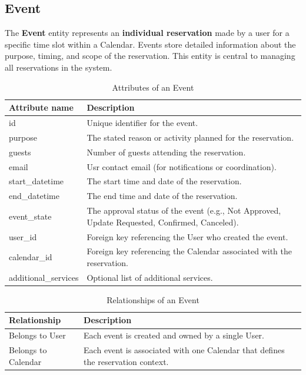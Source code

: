 \subsection{Event}

The \textbf{Event} entity represents an \textbf{individual reservation} made by a user for a specific time slot within a Calendar. Events store detailed information about the purpose, timing, and scope of the reservation. This entity is central to managing all reservations in the system. 

\begin{table}[H]
  \centering
  \begin{tabularx}{\textwidth}{|l|X|}
  \hline
  \textbf{Attribute name} & \textbf{Description} \\
  \hline
  id & Unique identifier for the event. \\
  \hline
  purpose & The stated reason or activity planned for the reservation. \\
  \hline
  guests & Number of guests attending the reservation. \\
  \hline
  email & Usr contact email (for notifications or coordination). \\
  \hline
  start\_datetime & The start time and date of the reservation. \\
  \hline
  end\_datetime & The end time and date of the reservation. \\
  \hline
  event\_state & The approval status of the event (e.g., Not Approved, Update Requested, Confirmed, Canceled). \\
  \hline
  user\_id & Foreign key referencing the User who created the event. \\
  \hline
  calendar\_id & Foreign key referencing the Calendar associated with the reservation. \\
  \hline
  additional\_services & Optional list of additional services. \\
  \hline
  \end{tabularx}
  \caption{Attributes of an Event}
  \label{tab:event-attributes}
\end{table}

\begin{table}[H]
  \centering
  \begin{tabularx}{\textwidth}{|l|X|}
  \hline
  \textbf{Relationship} & \textbf{Description} \\
  \hline
  Belongs to User & Each event is created and owned by a single User. \\
  \hline
  Belongs to Calendar & Each event is associated with one Calendar that defines the reservation context. \\
  \hline
  \end{tabularx}
  \caption{Relationships of an Event}
  \label{tab:event-relationships}
\end{table}

